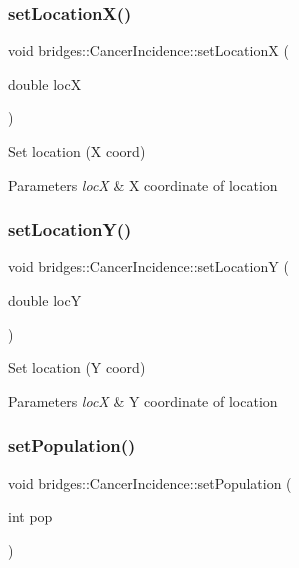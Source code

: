\subsubsection{\texorpdfstring{setLocationX()}{setLocationX()}}
{\footnotesize\ttfamily void bridges\+::\+Cancer\+Incidence\+::set\+LocationX (\begin{DoxyParamCaption}\item[{double}]{locX }\end{DoxyParamCaption})\hspace{0.3cm}{\ttfamily [inline]}}

Set location (X coord)


\begin{DoxyParams}{Parameters}
{\em locX} & X coordinate of location \\
\hline
\end{DoxyParams}
\mbox{\label{classbridges_1_1_cancer_incidence_a8ca0a21c2c5153b11adf6712e6648579}} 
\subsubsection{\texorpdfstring{setLocationY()}{setLocationY()}}
{\footnotesize\ttfamily void bridges\+::\+Cancer\+Incidence\+::set\+LocationY (\begin{DoxyParamCaption}\item[{double}]{locY }\end{DoxyParamCaption})\hspace{0.3cm}{\ttfamily [inline]}}

Set location (Y coord)


\begin{DoxyParams}{Parameters}
{\em locX} & Y coordinate of location \\
\hline
\end{DoxyParams}
\mbox{\label{classbridges_1_1_cancer_incidence_aaade0295abaeeabb23b9e03d5ffd364a}} 
\subsubsection{\texorpdfstring{setPopulation()}{setPopulation()}}
{\footnotesize\ttfamily void bridges\+::\+Cancer\+Incidence\+::set\+Population (\begin{DoxyParamCaption}\item[{int}]{pop }\end{DoxyParamCaption})\hspace{0.3cm}{\ttfamily [inline]}}

